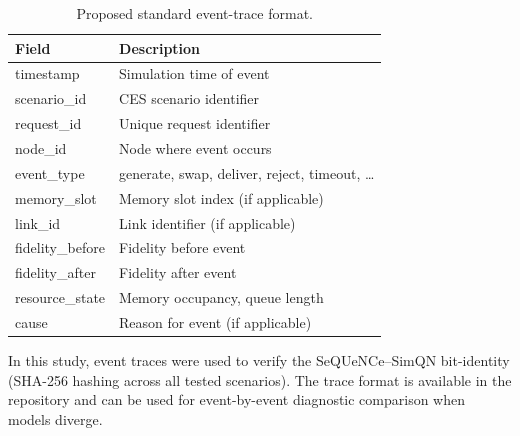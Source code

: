 \documentclass[aps,prapplied,reprint,superscriptaddress]{revtex4-2}
\begin{document}
\begin{table}[t]
\centering
\caption{Proposed standard event-trace format.}
\label{tab:trace}
\begin{tabular}{ll}
\toprule
Field & Description \\
\midrule
timestamp & Simulation time of event \\
scenario\_id & CES scenario identifier \\
request\_id & Unique request identifier \\
node\_id & Node where event occurs \\
event\_type & generate, swap, deliver, reject, timeout, \ldots \\
memory\_slot & Memory slot index (if applicable) \\
link\_id & Link identifier (if applicable) \\
fidelity\_before & Fidelity before event \\
fidelity\_after & Fidelity after event \\
resource\_state & Memory occupancy, queue length \\
cause & Reason for event (if applicable) \\
\bottomrule
\end{tabular}
\end{table}

In this study, event traces were used to verify the SeQUeNCe--SimQN bit-identity (SHA-256 hashing across all tested scenarios). The trace format is available in the repository and can be used for event-by-event diagnostic comparison when models diverge.
\end{document}
